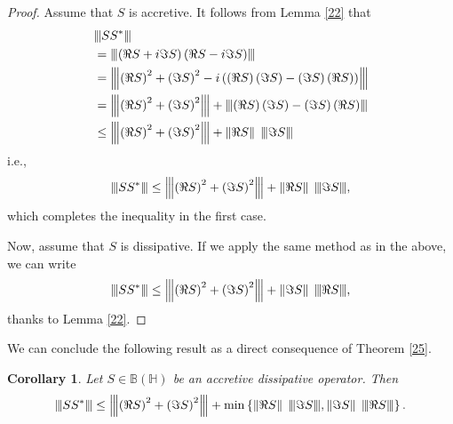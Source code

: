 \documentclass[12pt,twoside,reqno]{amsart}
\newcommand{\vertiii}[1]{{\left\vert\kern-0.25ex\left\vert\kern-0.25ex\left\vert #1 
    \right\vert\kern-0.25ex\right\vert\kern-0.25ex\right\vert}}
\newtheorem{corollary}{Corollary}[section]
\numberwithin{equation}{section}
\begin{document}
\begin{proof}
Assume that $S$ is accretive. It follows from Lemma \ref{22} that
\[\begin{aligned}
  & {{\vertiii{ S{{S}^{*}} }}} \\ 
 & ={{\vertiii{ \left( \Re S+i\Im S \right)\left( \Re S-i\Im S \right) }}} \\ 
 & ={{\vertiii{ {{\left( \Re S \right)}^{2}}+{{\left( \Im S \right)}^{2}}-i\left( \left( \Re S \right)\left( \Im S \right)-\left( \Im S \right)\left( \Re S \right) \right) }}} \\ 
 & ={{\vertiii{ {{\left( \Re S \right)}^{2}}+{{\left( \Im S \right)}^{2}} }}}+{{\vertiii{ \left( \Re S \right)\left( \Im S \right)-\left( \Im S \right)\left( \Re S \right) }}} \\ 
 & \le {{\vertiii{ {{\left( \Re S \right)}^{2}}+{{\left( \Im S \right)}^{2}} }}}+\left\| \Re S \right\|\;{{\vertiii{ \Im S }}} \\ 
\end{aligned}\]
i.e.,
\[{{\vertiii{ S{{S}^{*}} }}}\le {{\vertiii{ {{\left( \Re S \right)}^{2}}+{{\left( \Im S \right)}^{2}} }}}+\left\| \Re S \right\|\;{{\vertiii{ \Im S }}},\]
which completes the inequality in the first case.

Now, assume that $S$ is dissipative. If we apply the same method as in the above, we can write
\[{{\vertiii{ S{{S}^{*}} }}}\le {{\vertiii{ {{\left( \Re S \right)}^{2}}+{{\left( \Im S \right)}^{2}} }}}+\left\| \Im S \right\|\;{{\vertiii{ \Re S }}},\]
thanks to Lemma \ref{22}.
\end{proof}


We can conclude the following result as a direct consequence of Theorem \ref{25}.
\begin{corollary}
Let $S\in \mathbb B\left( \mathbb H \right)$ be an accretive dissipative operator. Then
\[{{\vertiii{ S{{S}^{*}} }}}\le {{\vertiii{ {{\left( \Re S \right)}^{2}}+{{\left( \Im S \right)}^{2}} }}}+\min \left\{ \left\| \Re S \right\|\;{{\vertiii{ \Im S }}},\left\| \Im S \right\|\;{{\vertiii{ \Re S }}} \right\}.\]
\end{corollary}
\end{document}
